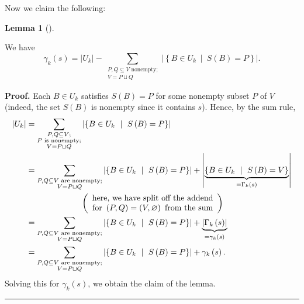 \documentclass[numbers=enddot,12pt,final,onecolumn,notitlepage]{scrartcl}%
\theoremstyle{definition}
\newtheorem{lem}[theo]{Lemma}
\newenvironment{lemma}[1][]
{\begin{lem}[#1]\begin{leftbar}}
{\end{leftbar}\end{lem}}
\newenvironment{proof}[1][Proof]{\noindent\textbf{#1.} }{\ \rule{0.5em}{0.5em}}
\let\sumnonlimits\sum
\renewcommand{\sum}{\sumnonlimits\limits}
\theoremstyle{plainsl}
\begin{document}
Now we claim the following:

\begin{lemma}
\label{lem.new1} We have%
\[
\gamma_{k}\left(  s\right)  =\left\vert U_{k}\right\vert -\sum
_{\substack{P,Q\subseteq V\text{ nonempty;}\\V=P\sqcup Q}}\left\vert \left\{
B\in U_{k}\ \mid\ S\left(  B\right)  =P\right\}  \right\vert .
\]

\end{lemma}

\begin{proof}
Each $B\in U_{k}$ satisfies $S\left(  B\right)  =P$ for some nonempty subset
$P$ of $V$ (indeed, the set $S\left(  B\right)  $ is nonempty since it
contains $s$). Hence, by the sum rule,%
\begin{align*}
\left\vert U_{k}\right\vert  &  =\sum_{\substack{P,Q\subseteq V;\\P\text{ is
nonempty;}\\V=P\sqcup Q}}\left\vert \left\{  B\in U_{k}\ \mid\ S\left(
B\right)  =P\right\}  \right\vert \\
&  =\sum_{\substack{P,Q\subseteq V\text{ are nonempty;}\\V=P\sqcup
Q}}\left\vert \left\{  B\in U_{k}\ \mid\ S\left(  B\right)  =P\right\}
\right\vert +\left\vert \underbrace{\left\{  B\in U_{k}\ \mid\ S\left(
B\right)  =V\right\}  }_{=\Gamma_{k}\left(  s\right)  }\right\vert \\
&  \ \ \ \ \ \ \ \ \ \ \ \ \ \ \ \ \ \ \ \ \left(
\begin{array}
[c]{c}%
\text{here, we have split off the addend}\\
\text{for }\left(  P,Q\right)  =\left(  V,\varnothing\right)  \text{ from the
sum}%
\end{array}
\right) \\
&  =\sum_{\substack{P,Q\subseteq V\text{ are nonempty;}\\V=P\sqcup
Q}}\left\vert \left\{  B\in U_{k}\ \mid\ S\left(  B\right)  =P\right\}
\right\vert +\underbrace{\left\vert \Gamma_{k}\left(  s\right)  \right\vert
}_{=\gamma_{k}\left(  s\right)  }\\
&  =\sum_{\substack{P,Q\subseteq V\text{ are nonempty;}\\V=P\sqcup
Q}}\left\vert \left\{  B\in U_{k}\ \mid\ S\left(  B\right)  =P\right\}
\right\vert +\gamma_{k}\left(  s\right)  .
\end{align*}
Solving this for $\gamma_{k}\left(  s\right)  $, we obtain the claim of the lemma.
\end{proof}
\end{document}
